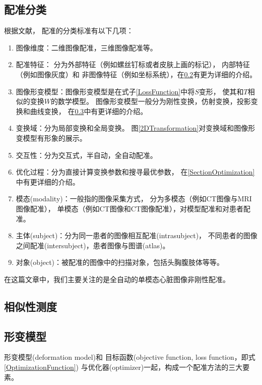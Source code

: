 \subsection{配准分类}\label{RegistrationClassification}
根据文献\cite{RegistrationSurvey,RegistrationSurveyNew}，
配准的分类标准有以下几项：
\begin{enumerate}
  \item 图像维度：二维图像配准，三维图像配准等。
  \item 配准特征：
    分为外部特征（例如螺丝钉标或者皮肤上画的标记），
    内部特征（例如图像灰度）和
    非图像特征（例如坐标系统），在\ref{SectionMetric}有更为详细的介绍。
  \item 图像形变模型：图像形变模型是在式子\ref{LossFunction}中将$S$变形，
    使其和$T$相似的变换$W$的数学模型。
    图像形变模型一般分为刚性变换，仿射变换，投影变换和曲线变换，
    在\ref{SectionTransformation}中有更详细的介绍。
  \item 变换域：分为局部变换和全局变换。
    图\ref{2DTransformation}对变换域和图像形变模型有形象的展示。
  \item 交互性：分为交互式，半自动，全自动配准。
  \item 优化过程：分为直接计算变换参数和搜寻最优参数，
    在\ref{SectionOptimization}中有更详细的介绍。
  \item 模态(modality)：一般指的图像采集方式，
    分为多模态（例如CT图像与MRI图像配准），
    单模态（例如CT图像和CT图像配准），对模型配准和对患者配准。
  \item 主体(subject)：分为同一患者的图像相互配准(intrasubject)，
    不同患者的图像之间配准(intersubject)，患者图像与图谱(atlas)。
  \item 对象(object)：被配准的图像中的扫描对象，包括头胸腹肢体等等。
\end{enumerate}

在这篇文章中，我们主要关注的是全自动的单模态心脏图像非刚性配准。


\subsection{相似性测度}\label{SectionMetric}

\subsection{形变模型}\label{SectionTransformation}
形变模型(deformation model)和
目标函数(objective function, loss function，即式\ref{OptimizationFunction})
与优化器(optimizer)一起，构成一个配准方法的三大要素。

